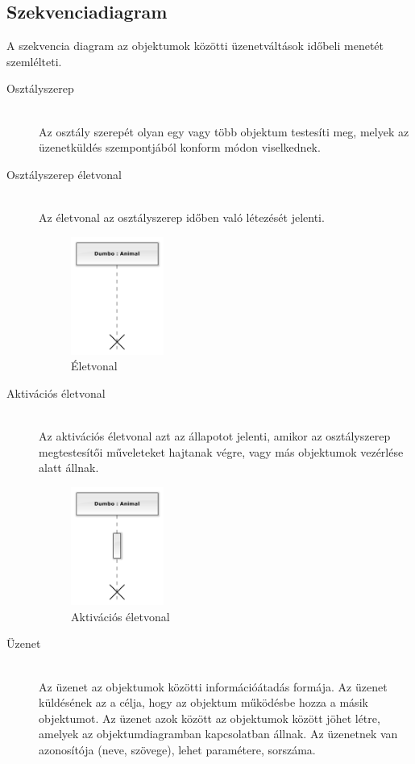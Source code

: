 \documentclass[margin=0px]{article}
\begin{document}
		\subsection{Szekvenciadiagram}
			A szekvencia diagram az objektumok közötti üzenetváltások időbeli menetét
			szemlélteti.
			\begin{description}
				\item[Osztályszerep] \hfill \\
					Az osztály szerepét olyan egy vagy több objektum testesíti meg, melyek az üzenetküldés szempontjából konform módon viselkednek.
				\item[Osztályszerep életvonal] \hfill \\
					Az életvonal az osztályszerep időben való létezését jelenti.
					\begin{figure}[H]
						\centering
						\includegraphics[width=0.3\textwidth]{img/eletvonal.png}
						\caption{Életvonal}
					\end{figure}
				\item[Aktivációs életvonal] \hfill \\
					Az aktivációs életvonal azt az állapotot jelenti, amikor az osztályszerep megtestesítői műveleteket hajtanak végre, vagy más objektumok vezérlése alatt állnak.
					\begin{figure}[H]
						\centering
						\includegraphics[width=0.3\textwidth]{img/aktivacios_eletvonal.png}
						\caption{Aktivációs életvonal}
					\end{figure}
				\item[Üzenet] \hfill \\
					Az üzenet az objektumok közötti információátadás formája. Az üzenet küldésének az a célja, hogy az objektum működésbe hozza a másik objektumot. Az üzenet azok között az objektumok között jöhet létre, amelyek az objektumdiagramban kapcsolatban állnak. Az üzenetnek van azonosítója (neve, szövege), lehet paramétere, sorszáma.
					
			\end{description}
\end{document}
